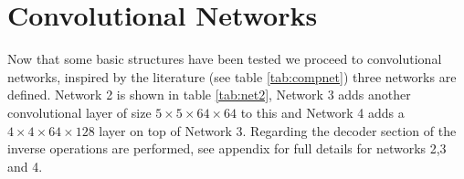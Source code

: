 
  \newpage
  \section{Convolutional Networks}

    Now that some basic structures have been tested we proceed to convolutional networks,
    inspired by the literature (see table \ref{tab:compnet}) three networks are defined.
    Network 2 is shown in table \ref{tab:net2}, Network 3
    adds another convolutional layer of size $5\times 5 \times 64 \times 64$ to this and
    Network 4 adds a $4\times 4 \times 64 \times 128$ layer
    on top of Network 3. Regarding the decoder section of the inverse operations are
    performed, see appendix \label{appendix1} for full details
    for networks 2,3 and 4.


